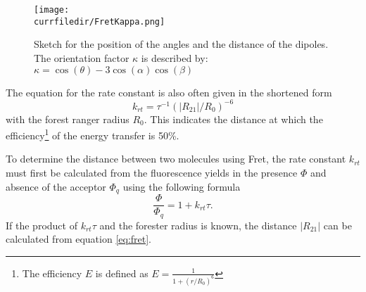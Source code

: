 \begin{figure}
\label{KappaFaktor}
\center
    \texttt{[image: \\currfiledir/FretKappa.png]}
    \caption{Sketch for the position of the angles and the distance of the dipoles. The orientation factor $\kappa$ is described by: $\kappa=\cos(\theta)-3 \cos (\alpha)\cos (\beta)$}
\end{figure}
The equation for the rate constant is also often given in the shortened form
\begin{equation}
\label{eq:fret}
    k_{rt}=\tau^{-1}(|R_{21}|/R_0)^{-6}
\end{equation}
with the forest ranger radius $R_0$. This indicates the distance at which the efficiency\footnote{The efficiency $E$ is defined as $E=\frac{1}{1+(r/R_0)^6}$ } of the energy transfer is 50\%.\par
To determine the distance between two molecules using Fret, the rate constant $k_{rt}$ must first be calculated from the fluorescence yields in the presence $\Phi$ and absence of the acceptor $\Phi_q$ using the following formula 
\[ \frac{\Phi}{\Phi_q}=1+k_{rt}\tau .\]
If the product of $k_{rt}\tau$ and the forester radius is known, the distance $|R_{21}|$ can be calculated from equation \ref{eq:fret}.




\printbibliography[segment=\therefsegment,heading=subbibliography]
